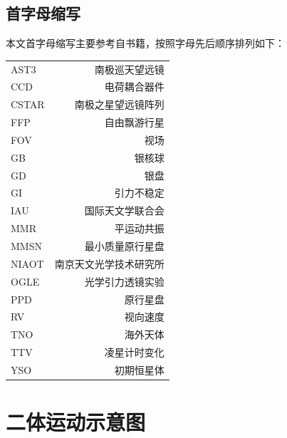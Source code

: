 \section{首字母缩写}  \label{apdx:acronym}
本文首字母缩写主要参考自书籍，按照字母先后顺序排列如下：
\begin{multicols}{2}
\begin{tabularx}{1.0\linewidth}{@{\extracolsep{\fill}}lr}
\centering
AST3           &   南极巡天望远镜     	   	  \\  
CCD		   &   电荷耦合器件			   \\
CSTAR        &   南极之星望远镜阵列 		   \\  
FFP             &   自由飘游行星        		   \\ 
FOV            &   视场			     		   \\ 
GB              &   银核球				   \\
GD              &   银盘				  	    \\
GI                &   引力不稳定              		    \\
IAU             &    国际天文学联合会   	    	    \\
MMR           &   平运动共振   	                     \\   
MMSN         &   最小质量原行星盘                 \\
NIAOT         &   南京天文光学技术研究所       \\
OGLE         &    光学引力透镜实验   	     	     \\
PPD            &    原行星盘   	   	     	     \\
RV              &    视向速度                    	     \\
TNO           &    海外天体                    	     \\
TTV            &    凌星计时变化             	     \\
YSO           &    初期恒星体                	     \\

\end{tabularx}
\columnbreak



\end{multicols}




\chapter{二体运动示意图} \label{apdx:twobodyproblem}

